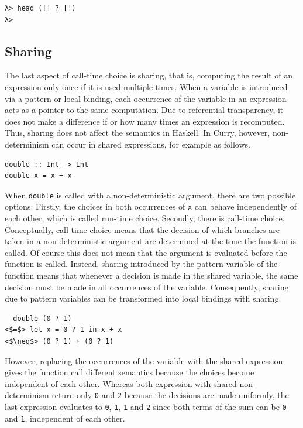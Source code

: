 \documentclass[a4paper, 11pt, fleqn, twoside]{scrreprt}
\newcommand{\hinl}[1]{\texttt{#1}}
\newcommand{\cinl}[1]{\texttt{#1}}
\begin{document}
\begin{verbatim}
λ> head ([] ? [])
λ>
\end{verbatim}

\subsection{Sharing}
The last aspect of call-time choice is sharing, that is, computing the result of an expression only once if it is used multiple times.
When a variable is introduced via a pattern or local binding, each occurrence of the variable in an expression acts as a pointer to the same computation.
Due to referential transparency, it does not make a difference if or how many times an expression is recomputed.
Thus, sharing does not affect the semantics in Haskell.
In Curry, however, non-determinism can occur in shared expressions, for example as follows.

\begin{verbatim}
double :: Int -> Int
double x = x + x
\end{verbatim}

When \hinl{double} is called with a non-deterministic argument, there are two possible options: Firstly, the choices in both occurrences of \hinl{x} can behave independently of each other, which is called run-time choice.
Secondly, there is call-time choice.
Conceptually, call-time choice means that the decision of which branches are taken in a non-deterministic argument are determined at the time the function is called.
Of course this does not mean that the argument is evaluated before the function is called.
Instead, sharing introduced by the pattern variable of the function means that whenever a decision is made in the shared variable, the same decision must be made in all occurrences of the variable.
Consequently, sharing due to pattern variables can be transformed into local bindings with sharing.

\begin{verbatim}
  double (0 ? 1) 
<$=$> let x = 0 ? 1 in x + x 
<$\neq$> (0 ? 1) + (0 ? 1)
\end{verbatim}

However, replacing the occurrences of the variable with the shared expression gives the function call different semantics because the choices become independent of each other.
Whereas both expression with shared non-determinism return only \hinl{0} and \hinl{2} because the decisions are made uniformly, the last expression evaluates to \hinl{0}, \hinl{1}, \hinl{1} and \cinl{2} since both terms of the sum can be \hinl{0} and \cinl{1}, independent of each other.
\end{document}

